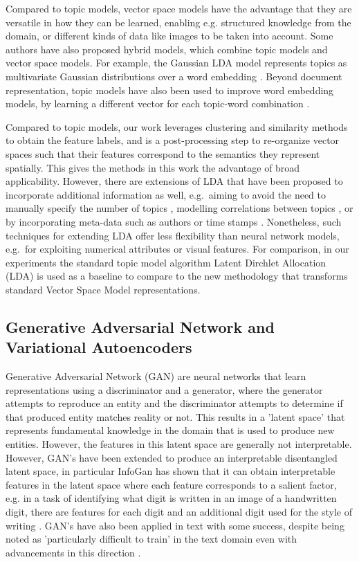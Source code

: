 Compared to topic models, vector space models have the advantage that they are versatile in how they can be learned, enabling e.g. structured knowledge from the domain, or different kinds of data like images to be taken into account. Some authors have also proposed hybrid models, which combine topic models and vector space models. For example, the Gaussian LDA model represents topics as multivariate Gaussian distributions over a word embedding \cite{DBLP:conf/acl/DasZD15}. Beyond document representation, topic models have also been used to improve word embedding models, by learning a different vector for each topic-word combination \cite{DBLP:conf/aaai/LiuLCS15}.

Compared to topic models, our work leverages clustering and similarity methods to obtain the feature labels, and is a post-processing step to re-organize vector spaces such that their features correspond to the semantics they represent spatially. This gives the methods in this work the advantage of broad applicability. However, there are extensions of LDA that have been proposed to incorporate additional information as well, e.g.\ aiming to avoid the need to manually specify the number of topics \cite{teh2005sharing}, modelling correlations between topics \cite{Blei2006}, or by incorporating meta-data such as authors or time stamps \cite{rosen2004author,wang2006topics}. Nonetheless, such techniques for extending LDA offer less flexibility than neural network models, e.g.\ for exploiting numerical attributes or visual features. For comparison, in our experiments the standard topic model algorithm Latent Dirchlet Allocation (LDA) is used as a baseline to  compare to the new methodology that transforms standard Vector Space Model representations. 

\subsection{Generative Adversarial Network and Variational Autoencoders}

Generative Adversarial Network (GAN) \cite{Goodfellow2014} are neural networks that learn representations using a discriminator and a generator, where the generator attempts to reproduce an entity and the discriminator attempts to determine if that produced entity matches reality or not. This results in a 'latent space' that represents fundamental knowledge in the domain that is used to produce new entities. However, the features in this latent space are generally not interpretable. However, GAN's have been extended to produce an interpretable disentangled latent space, in particular  InfoGan has shown that it can obtain interpretable features in the latent space where each feature corresponds to a salient factor, e.g. in a task of identifying what digit is written in an image of a handwritten digit, there are features for each digit and an additional digit used for the style of writing \cite{Chen2016}. GAN's have  also been applied in text \cite{Bowman2015, Kim} with some success, despite being noted as 'particularly difficult to train' in the text domain \cite{Arjovsky2017} even with advancements in this direction \cite{Mescheder2018}.

